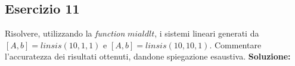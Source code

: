 \subsection{Esercizio 11}
Risolvere, utilizzando la \textit{function} $mialdlt$, i sistemi
lineari generati da $[A,b]=linsis(10, 1, 1)$ e $[A,b]=linsis(10, 10, 1)$. Commentare l'accuratezza dei
risultati ottenuti, dandone spiegazione esaustiva.
\newline \textbf{Soluzione:}